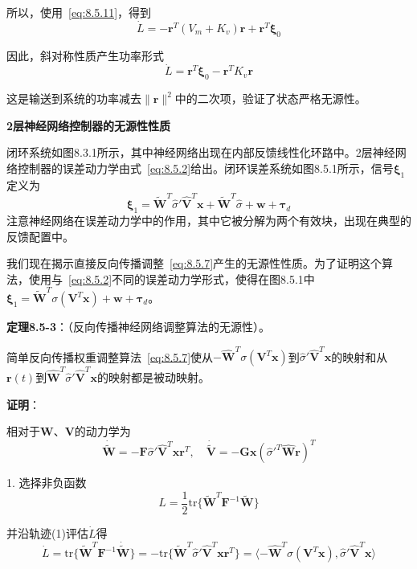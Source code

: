 \documentclass[12pt,a4paper]{ctexart}
\begin{document}
所以，使用~\eqref{eq:8.5.11}，得到
\begin{equation}
\dot{L} = -\bm{r}^T(V_m + K_v)\bm{r} + \bm{r}^T\bm{\xi}_0
\end{equation}

因此，斜对称性质产生功率形式
\begin{equation}
\dot{L} = \bm{r}^T\bm{\xi}_0 - \bm{r}^T K_v \bm{r}
\end{equation}

这是输送到系统的功率减去$\|\bm{r}\|^2$中的二次项，验证了状态严格无源性。

\textbf{2层神经网络控制器的无源性性质}

闭环系统如图8.3.1所示，其中神经网络出现在内部反馈线性化环路中。2层神经网络控制器的误差动力学由式~\eqref{eq:8.5.2}给出。闭环误差系统如图8.5.1所示，信号$\bm{\xi}_1$定义为
\begin{equation}\label{eq:8.5.12}
\bm{\xi}_1 = \tilde{\bm{W}}^T\hat{\sigma}'\hat{\bm{V}}^T\bm{x} + \tilde{\bm{W}}^T\hat{\sigma} + \bm{w} + \bm{\tau}_d
\end{equation}
注意神经网络在误差动力学中的作用，其中它被分解为两个有效块，出现在典型的反馈配置中。

我们现在揭示直接反向传播调整~\eqref{eq:8.5.7}产生的无源性性质。为了证明这个算法，使用与~\eqref{eq:8.5.2}不同的误差动力学形式，使得在图8.5.1中$\bm{\xi}_1 = \tilde{\bm{W}}^T\sigma(\bm{V}^T\bm{x}) + \bm{w} + \bm{\tau}_d$。

\textbf{定理8.5-3}：（反向传播神经网络调整算法的无源性）。

简单反向传播权重调整算法~\eqref{eq:8.5.7}使从$-\hat{\bm{W}}^T\sigma(\bm{V}^T\bm{x})$到$\hat{\sigma}'\hat{\bm{V}}^T\bm{x}$的映射和从$\bm{r}(t)$到$\hat{\bm{W}}^T\hat{\sigma}'\hat{\bm{V}}^T\bm{x}$的映射都是被动映射。

\textbf{证明}：

相对于$\bm{W}$、$\bm{V}$的动力学为
\begin{equation}
\dot{\tilde{\bm{W}}} = -\bm{F}\hat{\sigma}'\hat{\bm{V}}^T\bm{x}\bm{r}^T, \quad \dot{\tilde{\bm{V}}} = -\bm{G}\bm{x}(\hat{\sigma}'^T\hat{\bm{W}}\bm{r})^T
\end{equation}

1. 选择非负函数
\begin{equation}
L = \frac{1}{2}\text{tr}\{\tilde{\bm{W}}^T \bm{F}^{-1} \tilde{\bm{W}}\}
\end{equation}

并沿轨迹(1)评估$\dot{L}$得
\begin{equation}
\dot{L} = \text{tr}\{\tilde{\bm{W}}^T \bm{F}^{-1} \dot{\tilde{\bm{W}}}\} = -\text{tr}\{\tilde{\bm{W}}^T \hat{\sigma}'\hat{\bm{V}}^T\bm{x}\bm{r}^T\} = \langle -\hat{\bm{W}}^T\sigma(\bm{V}^T\bm{x}), \hat{\sigma}'\hat{\bm{V}}^T\bm{x} \rangle
\end{equation}
\end{document}
